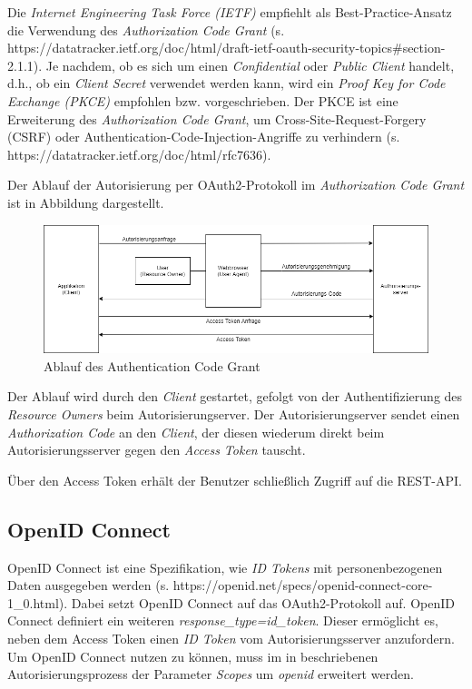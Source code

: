 Die \textit{Internet Engineering Task Force (IETF)} empfiehlt als Best-Practice-Ansatz die Verwendung des \textit{Authorization Code Grant} (s. https://datatracker.ietf.org/doc/html/draft-ietf-oauth-security-topics#section-2.1.1). 
Je nachdem, ob es sich um einen \textit{Confidential} oder \textit{Public Client} handelt, d.h., ob ein \textit{Client Secret} verwendet werden kann, wird ein \textit{Proof Key for Code Exchange (PKCE)} empfohlen bzw. vorgeschrieben. 
Der PKCE ist eine Erweiterung des \textit{Authorization Code Grant}, um Cross-Site-Request-Forgery (CSRF) oder Authentication-Code-Injection-Angriffe zu verhindern (s. https://datatracker.ietf.org/doc/html/rfc7636).

Der Ablauf der Autorisierung per OAuth2-Protokoll im \textit{Authorization Code Grant} ist in Abbildung  dargestellt. 

\begin{figure}[htbp]
\centering
\includegraphics[width=\textwidth]{Authentication_Code_Grant.png}
\caption{Ablauf des Authentication Code Grant}
\label{fig:auth-code-grant}
\end{figure}

Der Ablauf wird durch den \textit{Client} gestartet, gefolgt von der Authentifizierung des \textit{Resource Owners} beim Autorisierungserver. 
Der Autorisierungserver sendet einen \textit{Authorization Code} an den \textit{Client}, der diesen wiederum direkt beim Autorisierungsserver gegen den \textit{Access Token} tauscht.

Über den Access Token erhält der Benutzer schließlich Zugriff auf die REST-API.

\subsection{OpenID Connect}
\label{auth:openid}

OpenID Connect ist eine Spezifikation, wie \textit{ID Tokens} mit personenbezogenen Daten ausgegeben werden (s. https://openid.net/specs/openid-connect-core-1_0.html). 
Dabei setzt OpenID Connect auf das OAuth2-Protokoll auf. 
OpenID Connect definiert ein weiteren \textit{response_type=id_token}. 
Dieser ermöglicht es, neben dem Access Token einen \textit{ID Token} vom Autorisierungsserver anzufordern. 
Um OpenID Connect nutzen zu können, muss im in  beschriebenen Autorisierungsprozess der Parameter \textit{Scopes} um \textit{openid} erweitert werden.

